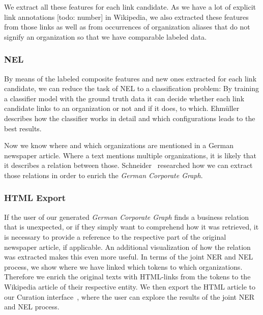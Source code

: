 We extract all these features for each link candidate. As we have a lot of explicit link annotations [todo: number] in Wikipedia, we also extracted these features from those links as well as from occurrences of organization aliases that do not signify an organization so that we have comparable labeled data.\\


\subsubsection{NEL}
By means of the labeled composite features and new ones extracted for each link candidate, we can reduce the task of NEL to a classification problem: By training a classifier model with the ground truth data it can decide whether each link candidate links to an organization or not and if it does, to which. Ehmüller~\cite{ehmueller} describes how the classifier works in detail and which configurations leads to the best results.

Now we know where and which organizations are mentioned in a German newspaper article. Where a text mentions multiple organizations, it is likely that it describes a relation between those. Schneider~\cite{schneider} researched how we can extract those relations in order to enrich the \textit{German Corporate Graph}.\\


\subsubsection{HTML Export}
If the user of our generated \textit{German Corporate Graph} finds a business relation that is unexpected, or if they simply want to comprehend how it was retrieved, it is necessary to provide a reference to the respective part of the original newspaper article, if applicable. An additional visualization of how the relation was extracted makes this even more useful. In terms of the joint NER and NEL process, we show where we have linked which tokens to which organizations. Therefore we enrich the original texts with HTML-links from the tokens to the Wikipedia article of their respective entity. We then export the HTML article to our Curation interface~\cite{gruner}, where the user can explore the results of the joint NER and NEL process.\\
